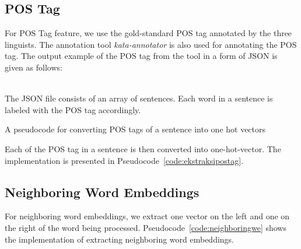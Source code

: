 \subsection{POS Tag}
For POS Tag feature, we use the gold-standard POS tag annotated by the three linguists. The annotation tool \textit{kata-annotator} is also used for annotating the POS tag. The output example of the POS tag from the tool in a form of JSON is given as follows:

\\

The JSON file consists of an array of sentences. Each word in a sentence is labeled with the POS tag accordingly.

\begin{kode}
	
	
	\caption{A pseudocode for converting POS tags of a sentence into one hot vectors}
	\label{code:ekstraksipostag}
\end{kode}

Each of the POS tag in a sentence is then converted into one-hot-vector. The implementation is presented in Pseudocode~\ref{code:ekstraksipostag}.

\subsection{Neighboring Word Embeddings}
For neighboring word embeddings, we extract one vector on the left and one on the right of the word being processed. Pseudocode~\ref{code:neighboringwe} shows the implementation of extracting neighboring word embeddings.


